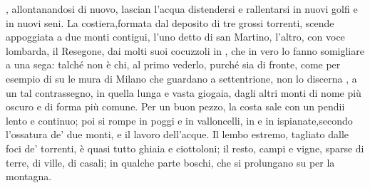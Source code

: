 \documentclass[b5paper]{book}
\begin{document}
{{}}, allontanandosi di nuovo, lascian l’acqua distendersi e rallentarsi in nuovi golfi e in nuovi seni. La costiera,formata dal deposito di tre grossi torrenti, scende appoggiata a due monti contigui, l’uno detto di san Martino, l’altro, con voce lombarda, il Resegone, dai molti suoi cocuzzoli in , che in vero lo fanno somigliare a una sega: talché non è chi, al primo vederlo, purché sia di fronte, come per esempio di su le mura di Milano che guardano a settentrione, non lo discerna , a un tal contrassegno, in quella lunga e vasta giogaia, dagli altri monti di nome più oscuro e di forma più comune. Per un buon pezzo, la costa sale con un pendii lento e continuo; poi si rompe in poggi e in valloncelli, in  e in ispianate,secondo l’ossatura de’ due monti, e il lavoro dell’acque. Il lembo estremo, tagliato dalle foci de’ torrenti, è quasi tutto ghiaia e ciottoloni; il resto, campi e vigne, sparse di terre, di ville, di casali; in qualche parte boschi, che si prolungano su per la montagna. 
\pend
\end{document}
